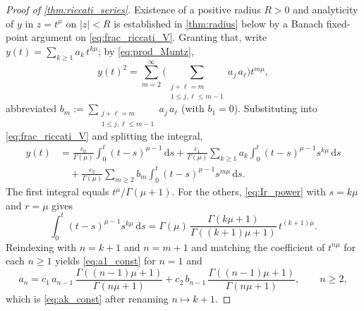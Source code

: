 \documentclass[11pt,a4paper]{article}
\newcommand{\dd}{\,\mathrm{d}}
\begin{document}
\begin{proof}[Proof of \cref{thm:riccati_series}]
Existence of a positive radius \(R>0\) and analyticity of \(y\) in \(z=t^\mu\) on \(|z|<R\) is established in \cref{thm:radius} below by a Banach fixed-point argument on \eqref{eq:frac_riccati_V}.
Granting that, write \(y(t)=\sum_{k\ge1}a_k\,t^{k\mu}\); by \eqref{eq:prod_Muntz},
\[
y(t)^2=\sum_{m=2}^{\infty}\!\Big(\sum_{\substack{j+\ell=m\\1\le j,\ell\le m-1}}\!a_j\,a_\ell\Big)t^{m\mu},
\]
abbreviated \(b_m:=\sum_{\substack{j+\ell=m\\1\le j,\ell\le m-1}}a_j\,a_\ell\) (with \(b_1=0\)).
Substituting into \eqref{eq:frac_riccati_V} and splitting the integral,
\begin{align*}
y(t)
&=
\frac{c_0}{\Gamma(\mu)}\!\int_0^t\!(t-s)^{\mu-1}\dd s
+\frac{c_1}{\Gamma(\mu)}\sum_{k\ge1}a_k\!\int_0^t\!(t-s)^{\mu-1}s^{k\mu}\dd s\\
&\quad
+\frac{c_2}{\Gamma(\mu)}\sum_{m\ge2}b_m\!\int_0^t\!(t-s)^{\mu-1}s^{m\mu}\dd s.
\end{align*}
The first integral equals \(t^\mu/\Gamma(\mu+1)\). For the others, \eqref{eq:Ir_power} with \(s=k\mu\) and \(r=\mu\) gives
\[
\int_0^t (t-s)^{\mu-1}s^{k\mu}\dd s
= \Gamma(\mu)\,\frac{\Gamma(k\mu+1)}{\Gamma((k+1)\mu+1)}\,t^{(k+1)\mu}.
\]
Reindexing with \(n=k+1\) and \(n=m+1\) and matching the coefficient of \(t^{n\mu}\) for each \(n\ge1\) yields \eqref{eq:a1_const} for \(n=1\) and
\[
a_n = c_1\,a_{n-1}\,\frac{\Gamma((n-1)\mu+1)}{\Gamma(n\mu+1)}
+ c_2\,b_{n-1}\,\frac{\Gamma((n-1)\mu+1)}{\Gamma(n\mu+1)},\qquad n\ge2,
\]
which is \eqref{eq:ak_const} after renaming \(n\mapsto k+1\).
\end{proof}
\end{document}
